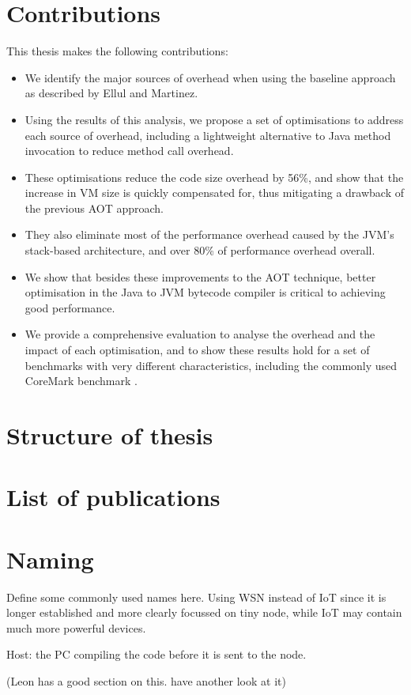 \section{Contributions}

This thesis makes the following contributions:
\begin{itemize}
	\item We identify the major sources of overhead when using the baseline approach as described by Ellul and Martinez.
	\item Using the results of this analysis, we propose a set of optimisations to address each source of overhead, including a lightweight alternative to Java method invocation to reduce method call overhead.
	\item These optimisations reduce the code size overhead by 56\%, and show that the increase in VM size is quickly compensated for, thus mitigating a drawback of the previous AOT approach.
	\item They also eliminate most of the performance overhead caused by the JVM's stack-based architecture, and over 80\% of performance overhead overall.
	\item We show that besides these improvements to the AOT technique, better optimisation in the Java to JVM bytecode compiler is critical to achieving good performance.
	\item We provide a comprehensive evaluation to analyse the overhead and the impact of each optimisation, and to show these results hold for a set of benchmarks with very different characteristics, including the commonly used CoreMark benchmark \cite{coremark}.
\end{itemize}

\section{Structure of thesis}


\section{List of publications}

\section{Naming}

Define some commonly used names here. Using WSN instead of IoT since it is longer established and more clearly focussed on tiny node, while IoT may contain much more powerful devices.

Host: the PC compiling the code before it is sent to the node.

(Leon has a good section on this. have another look at it)